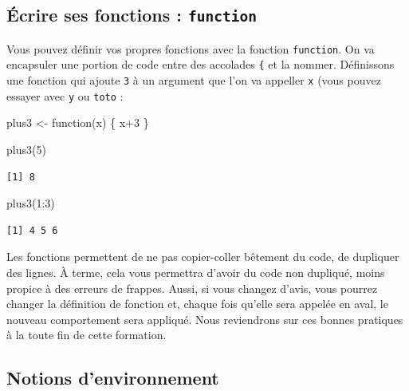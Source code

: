 \documentclass[
  letterpaper,
  DIV=11,
  numbers=noendperiod]{scrreprt}
\newenvironment{Shaded}{\begin{snugshade}}{\end{snugshade}}
\newcommand{\ControlFlowTok}[1]{\textcolor[rgb]{0.00,0.23,0.31}{#1}}
\newcommand{\DecValTok}[1]{\textcolor[rgb]{0.68,0.00,0.00}{#1}}
\newcommand{\FunctionTok}[1]{\textcolor[rgb]{0.28,0.35,0.67}{#1}}
\newcommand{\NormalTok}[1]{\textcolor[rgb]{0.00,0.23,0.31}{#1}}
\newcommand{\OtherTok}[1]{\textcolor[rgb]{0.00,0.23,0.31}{#1}}
\newcommand{\SpecialCharTok}[1]{\textcolor[rgb]{0.37,0.37,0.37}{#1}}
\begin{document}
\hypertarget{uxe9crire-ses-fonctions-function}{%
\subsection{\texorpdfstring{Écrire ses fonctions :
\texttt{function}}{Écrire ses fonctions : function}}\label{uxe9crire-ses-fonctions-function}}

Vous pouvez définir vos propres fonctions avec la fonction
\texttt{function}. On va encapsuler une portion de code entre des
accolades \texttt{\{} et la nommer. Définissons une fonction qui ajoute
\texttt{3} à un argument que l'on va appeller \texttt{x} (vous pouvez
essayer avec \texttt{y} ou \texttt{toto} :

\begin{Shaded}
\begin{Highlighting}[]
\NormalTok{plus3 }\OtherTok{\textless{}{-}} \ControlFlowTok{function}\NormalTok{(x) \{}
\NormalTok{  x}\SpecialCharTok{+}\DecValTok{3}
\NormalTok{\}}

\FunctionTok{plus3}\NormalTok{(}\DecValTok{5}\NormalTok{)}
\end{Highlighting}
\end{Shaded}

\begin{verbatim}
[1] 8
\end{verbatim}

\begin{Shaded}
\begin{Highlighting}[]
\FunctionTok{plus3}\NormalTok{(}\DecValTok{1}\SpecialCharTok{:}\DecValTok{3}\NormalTok{)}
\end{Highlighting}
\end{Shaded}

\begin{verbatim}
[1] 4 5 6
\end{verbatim}

Les fonctions permettent de ne pas copier-coller bêtement du code, de
dupliquer des lignes. À terme, cela vous permettra d'avoir du code non
dupliqué, moins propice à des erreurs de frappes. Aussi, si vous changez
d'avis, vous pourrez changer la définition de fonction et, chaque fois
qu'elle sera appelée en aval, le nouveau comportement sera appliqué.
Nous reviendrons sur ces bonnes pratiques à la toute fin de cette
formation.

\hypertarget{notions-denvironnement}{%
\subsection{Notions d'environnement}\label{notions-denvironnement}}
\end{document}
